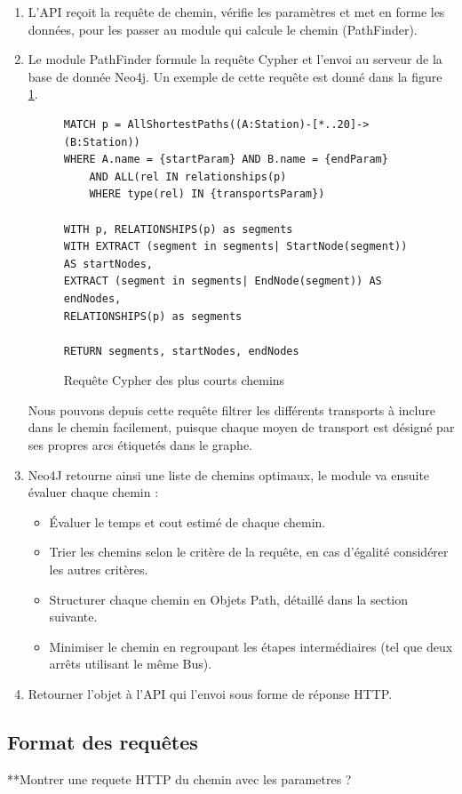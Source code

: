 \begin{enumerate}
	\item L'API reçoit la requête de chemin, vérifie les paramètres et met en forme les données, pour les passer au module qui calcule le chemin (PathFinder).
	\item Le module PathFinder formule la requête Cypher et l'envoi au serveur de la base de donnée Neo4j.
	      Un exemple de cette requête est donné dans la figure \ref{fig:cipherRequest}.
\begin{figure}[h!]
	      \begin{lstlisting}[style=cypher]
MATCH p = AllShortestPaths((A:Station)-[*..20]->(B:Station))
WHERE A.name = {startParam} AND B.name = {endParam}
	AND ALL(rel IN relationships(p) 
	WHERE type(rel) IN {transportsParam})

WITH p, RELATIONSHIPS(p) as segments
WITH EXTRACT (segment in segments| StartNode(segment)) AS startNodes,
EXTRACT (segment in segments| EndNode(segment)) AS endNodes,
RELATIONSHIPS(p) as segments
            
RETURN segments, startNodes, endNodes
	      \end{lstlisting}
\caption{Requête Cypher des plus courts chemins}
\label{fig:cipherRequest}
\end{figure}
	      Nous pouvons depuis cette requête filtrer les différents transports à inclure dans le chemin facilement, puisque chaque moyen de transport est désigné par ses propres arcs étiquetés dans le graphe.
	\item Neo4J retourne ainsi une liste de chemins optimaux, le module va ensuite évaluer chaque chemin :
	      \begin{itemize}
	      	\item Évaluer le temps et cout estimé de chaque chemin.
	      	\item Trier les chemins selon le critère de la requête, en cas d'égalité considérer les autres critères.
	      	\item Structurer chaque chemin en Objets Path, détaillé dans la section suivante.
	      	\item Minimiser le chemin en regroupant les étapes intermédiaires (tel que deux arrêts utilisant le même Bus).
	      \end{itemize}
	\item Retourner l'objet à l'API qui l'envoi sous forme de réponse HTTP.
\end{enumerate}
\label{SectionPathFinding}
	
\subsection{Format des requêtes}
**Montrer une requete HTTP du chemin avec les parametres ? 
